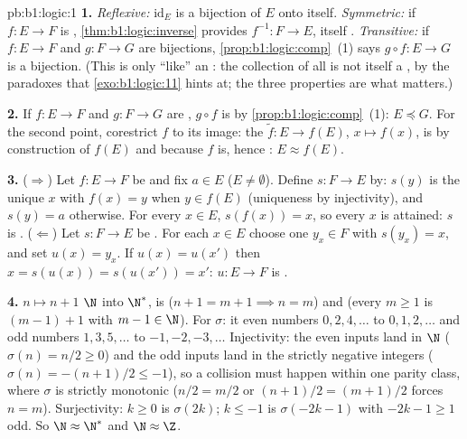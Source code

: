 \begin{solution}{pb:b1:logic:1}
\textbf{1.} \emph{Reflexive:} $\mathrm{id}_E$ is a bijection of $E$
onto itself. \emph{Symmetric:} if $f \colon E \to F$ is ,
\cref{thm:b1:logic:inverse} provides $f^{-1} \colon F \to E$, itself
. \emph{Transitive:} if $f \colon E \to F$ and $g \colon F
\to G$ are bijections, \cref{prop:b1:logic:comp}~(1) says $g \circ f
\colon E \to G$ is a bijection. (This is only ``like'' an : the collection of all  is not itself a , by the
paradoxes that \cref{exo:b1:logic:11} hints at; the three properties
are what matters.)

\textbf{2.} If $f \colon E \to F$ and $g \colon F \to G$ are
, $g \circ f$ is  by \cref{prop:b1:logic:comp}~(1):
$E \preceq G$. For the second point, corestrict $f$ to its image: the
 $\tilde f \colon E \to f(E)$, $x \mapsto f(x)$, is  by
construction of $f(E)$ and  because $f$ is, hence :
$E \approx f(E)$.

\textbf{3.} ($\Rightarrow$) Let $f \colon E \to F$ be  and
fix $a \in E$ ($E \neq \emptyset$). Define $s \colon F \to E$ by:
$s(y)$ is the unique $x$ with $f(x) = y$ when $y \in f(E)$
(uniqueness by injectivity), and $s(y) = a$ otherwise. For every $x
\in E$, $s(f(x)) = x$, so every $x$ is attained: $s$ is .
($\Leftarrow$) Let $s \colon F \to E$ be . For each $x \in
E$ choose one $y_x \in F$ with $s(y_x) = x$, and set $u(x) = y_x$. If
$u(x) = u(x')$ then $x = s(u(x)) = s(u(x')) = x'$: $u \colon E \to F$
is .

\textbf{4.} $n \mapsto n + 1$  $\N$ into $\N^*$, is 
($n + 1 = m + 1 \implies n = m$) and  (every $m \geq 1$ is
$(m - 1) + 1$ with $m - 1 \in \N$). For $\sigma$: it  even
numbers $0, 2, 4, \dots$ to $0, 1, 2, \dots$ and odd numbers $1, 3,
5, \dots$ to $-1, -2, -3, \dots$ Injectivity: the even inputs land in
$\N$ ($\sigma(n) = n/2 \geq 0$) and the odd inputs land in the
strictly negative integers ($\sigma(n) = -(n+1)/2 \leq -1$), so a
collision must happen within one parity class, where $\sigma$ is
strictly monotonic ($n/2 = m/2$ or $(n+1)/2 = (m+1)/2$ forces $n =
m$). Surjectivity: $k \geq 0$ is $\sigma(2k)$; $k \leq -1$ is
$\sigma(-2k - 1)$ with $-2k - 1 \geq 1$ odd. So $\N \approx \N^*$ and
$\N \approx \Z$.


\end{solution}
